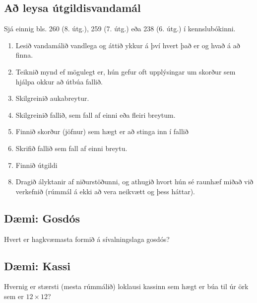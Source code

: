 \documentclass[b5paper,11pt,icelandic]{sphinxmanual}
\begin{document}
\subsection{Að leysa útgildisvandamál}
\label{kafli05:a-leysa-utgildisvandamal}
Sjá einnig bls. 260 (8. útg.), 259 (7. útg.) eða 238 (6. útg.) í kennslubókinni.
\begin{enumerate}
\item {} 
Lesið vandamálið vandlega og áttið ykkur á því hvert það er og
hvað á að finna.

\item {} 
Teiknið mynd ef mögulegt er, hún gefur oft upplýsingar um skorður
sem hjálpa okkur að útbúa fallið.

\item {} 
Skilgreinið aukabreytur.

\item {} 
Skilgreinið fallið, sem fall af einni eða fleiri breytum.

\item {} 
Finnið skorður (jöfnur) sem hægt er að stinga inn í fallið

\item {} 
Skrifið fallið sem fall af einni breytu.

\item {} 
Finnið útgildi

\item {} 
Dragið ályktanir af niðurstöðunni, og athugið hvort hún sé
raunhæf miðað við verkefnið (rúmmál á ekki að vera neikvætt og
þess háttar).

\end{enumerate}


\subsection{Dæmi: Gosdós}
\label{kafli05:daemi-gosdos}
Hvert er hagkvæmasta formið á sívalningslaga gosdós?



\subsection{Dæmi: Kassi}
\label{kafli05:daemi-kassi}
Hvernig er stærsti (mesta rúmmálið) loklausi kassinn sem hægt er búa til úr
örk sem er \(12 \times 12\)?
\end{document}
